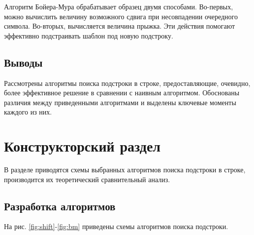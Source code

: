 \documentclass[a4paper,12pt]{article}
\begin{document}
Алгоритм Бойера-Мура обрабатывает образец двумя способами.
Во-первых, можно вычислить величину возможного сдвига при несовпадении
очередного символа.
Во-вторых, вычисляется величина
прыжка. Эти действия помогают эффективно подстраивать шаблон под новую подстроку.

\subsection*{Выводы}

Рассмотрены алгоритмы поиска подстроки в строке,
предоставляющие, очевидно, более эффективное решение в сравнении с наивным алгоритмом.
Обоснованы различия между приведенными алгоритмами и выделены ключевые моменты
каждого из них.

\section{Конструкторский раздел}

В разделе приводятся схемы выбранных алгоритмов поиска подстроки в строке,
производится их теоретический сравнительный анализ.

\subsection{Разработка алгоритмов}

На рис. \ref{fig:shift}-\ref{fig:bm} приведены схемы 
алгоритмов поиска подстроки.
\end{document}
